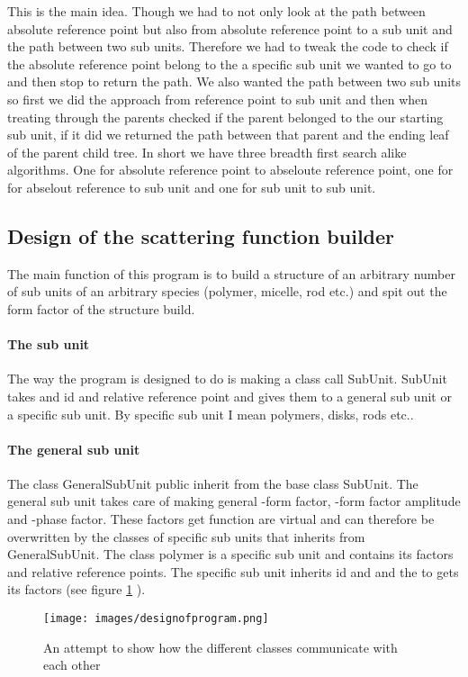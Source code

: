     This is the main idea. Though we had to not only look at the path between absolute reference point but also from absolute reference point to a sub unit and the path between two sub units. Therefore we had to tweak the code to check if the absolute reference point belong to the a specific sub unit we wanted to go to and then stop to return the path. We also wanted the path between two sub units so first we did the approach from reference point to sub unit and then when treating through the parents checked if the parent belonged to the our starting sub unit, if it did we returned the path between that parent and the ending leaf of the parent child tree. In short we have three breadth first search alike algorithms. One for absolute reference point to abseloute reference point, one for for abselout reference to sub unit and one for sub unit to sub unit.  
    
    
    \subsection{Design of the scattering function builder}
    The main function of this program is to build a structure of an arbitrary number of sub units of an arbitrary species (polymer, micelle, rod etc.) and spit out the form factor of the structure build. \paragraph{The sub unit} The way the program is designed to do is making a class call SubUnit. SubUnit takes and id and relative reference point and gives them to a general sub unit or a specific sub unit. By specific sub unit I mean polymers, disks, rods etc.. \paragraph{The general sub unit} The class GeneralSubUnit public inherit from the base class SubUnit. The general sub unit takes care of making general -form factor, -form factor amplitude and -phase factor. These factors get function are virtual and can therefore be overwritten by the classes of specific sub units that inherits from GeneralSubUnit. The class polymer is a specific sub unit and contains its factors and relative reference points. The specific sub unit inherits id and and the to gets its factors (see figure \ref{fig:design} ). 
    \begin{figure}
        \centering
        \texttt{[image: images/designofprogram.png]}
        \caption{An attempt to show how the different classes communicate with each other}
        \label{fig:design}
    \end{figure}

